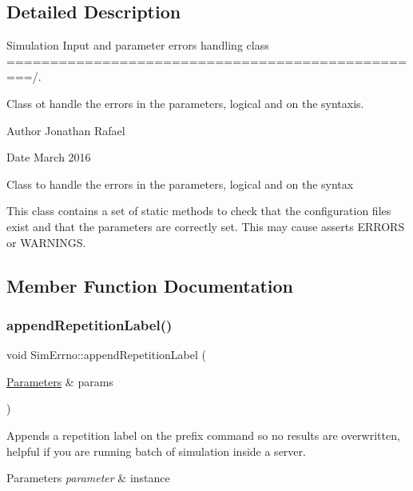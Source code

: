 \subsection{Detailed Description}
Simulation Input and parameter errors handling class =================================================/. 

Class ot handle the errors in the parameters, logical and on the syntaxis. \begin{DoxyAuthor}{Author}
Jonathan Rafael 
\end{DoxyAuthor}
\begin{DoxyDate}{Date}
March 2016 


\end{DoxyDate}
Class to handle the errors in the parameters, logical and on the syntax

This class contains a set of static methods to check that the configuration files exist and that the parameters are correctly set. This may cause asserts E\+R\+R\+O\+RS or W\+A\+R\+N\+I\+N\+GS. 

\subsection{Member Function Documentation}
\mbox{\label{class_sim_errno_a3dfc14a69998cff0ee82f8bb6ef2ddc4}} 
\subsubsection{\texorpdfstring{append\+Repetition\+Label()}{appendRepetitionLabel()}}
{\footnotesize\ttfamily void Sim\+Errno\+::append\+Repetition\+Label (\begin{DoxyParamCaption}\item[{\hyperlink{class_parameters}{Parameters} \&}]{params }\end{DoxyParamCaption})\hspace{0.3cm}{\ttfamily [static]}}



Appends a repetition label on the prefix command so no results are overwritten, helpful if you are running batch of simulation inside a server. 


\begin{DoxyParams}{Parameters}
{\em parameter} & instance \\
\hline
\end{DoxyParams}
\mbox{\label{class_sim_errno_a4b59c263ba564ebc9edbd40fe9ec3bc8}} 

